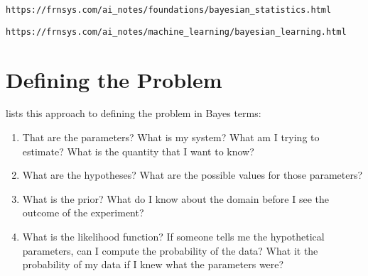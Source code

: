 \clearpage
{}

\lstinline{https://frnsys.com/ai_notes/foundations/bayesian_statistics.html}

\lstinline{https://frnsys.com/ai_notes/machine_learning/bayesian_learning.html}


\section{Defining the Problem}

 lists this approach to defining the problem in Bayes terms:

\begin{enumerate}
\item That are the parameters?  What is my system? What am I trying to estimate?
What is the quantity that I want to know?

\item What are the hypotheses?
What are the possible values for those parameters?


\item What is the prior?
What do I know about the domain before I see the outcome of the experiment?


\item What is the likelihood function?
If someone tells me the hypothetical parameters, can I compute the probability of the data?
What it the probability of my data if I knew what the parameters were?

\end{enumerate} 